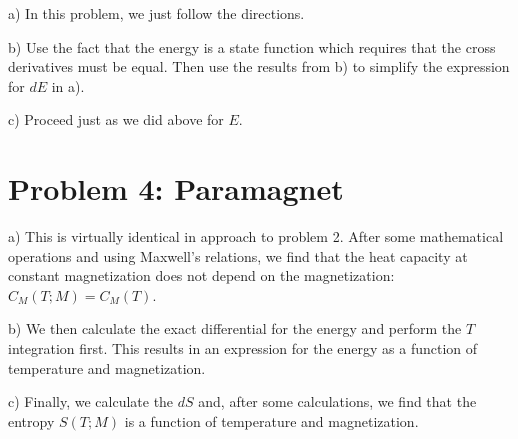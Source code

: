 \documentclass[12pt]{article}
\begin{document}
a) In this problem, we just follow the directions.

b) Use the fact that the energy is a state function which requires that the cross derivatives must be equal. Then use the results from b) to simplify the expression for $dE$ in a).

c) Proceed just as we did above for $E$.

\section*{Problem 4: Paramagnet}

a) This is virtually identical in approach to problem 2. After some mathematical operations and using Maxwell's relations, we find that the heat capacity at constant magnetization does not depend on the magnetization: $C_M(T;M) = C_M(T)$.

b) We then calculate the exact differential for the energy and perform the $T$ integration first. This results in an expression for the energy as a function of temperature and magnetization.

c) Finally, we calculate the $dS$ and, after some calculations, we find that the entropy $S(T;M)$ is a function of temperature and magnetization.
\end{document}
